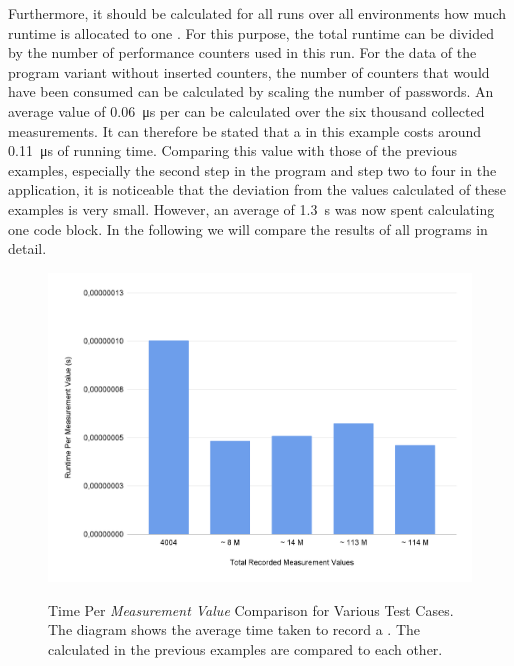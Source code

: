 Furthermore, it should be calculated for all runs over all environments how much runtime is allocated to one \MEASUREVALUE. For this purpose, the total runtime can be divided by the number of performance counters used in this run. For the data of the program variant without inserted counters, the number of counters that would have been consumed can be calculated by scaling the number of passwords. An average value of \SI{0.06}{\micro\second} per \MEASUREVALUE can be calculated over the six thousand collected measurements. It can therefore be stated that a \MEASUREPAIR in this example costs around \SI{0.11}{\micro\second} of running time. Comparing this value with those of the previous examples, especially the second step in the \FIBONACCI program and step two to four in the \PASSWORDGEN application, it is noticeable that the deviation from the values calculated of these examples is very small. However, an average of \SI{1.3}{\second} was now spent calculating one code block. In the following we will compare the results of all programs in detail.

\begin{figure}[t]
    \centering
    \caption[Time Per \emph{Measurement Value} Comparison for Various Test Cases.]{Time Per \emph{Measurement Value} Comparison for Various Test Cases. The diagram shows the average time taken to record a \MEASUREVALUE. The \MEASUREVALUES calculated in the previous examples are compared to each other.}
    \includegraphics[width=\textwidth]{graphics/e_conclusion_per_counter.png}
    \label{fig:e:conclusion_per_counter}
\end{figure}
 
